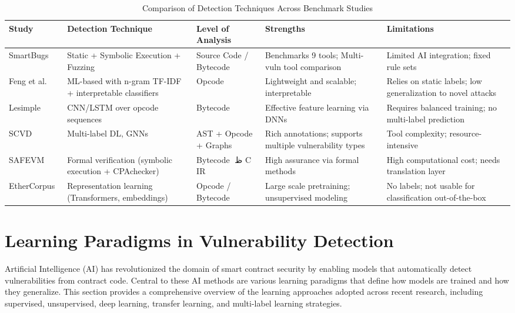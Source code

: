 \begin{table}[H]
\centering
\renewcommand{\arraystretch}{1.3}
\begin{tabular}{|p{3.2cm}|p{2.8cm}|p{2.4cm}|p{3.3cm}|p{2.8cm}|}
\hline
\textbf{Study} & \textbf{Detection Technique} & \textbf{Level of Analysis} & \textbf{Strengths} & \textbf{Limitations} \\ \hline

SmartBugs~\cite{durieux2020empirical} & Static + Symbolic Execution + Fuzzing & Source Code / Bytecode & Benchmarks 9 tools; Multi-vuln tool comparison & Limited AI integration; fixed rule sets \\ \hline

Feng et al.~\cite{feng2024interpretable} & ML-based with n-gram TF-IDF + interpretable classifiers & Opcode & Lightweight and scalable; interpretable & Relies on static labels; low generalization to novel attacks \\ \hline

Lesimple~\cite{lesimple2020master} & CNN/LSTM over opcode sequences & Bytecode & Effective feature learning via DNNs & Requires balanced training; no multi-label prediction \\ \hline

SCVD~\cite{zhang2020scvd} & Multi-label DL, GNNs & AST + Opcode + Graphs & Rich annotations; supports multiple vulnerability types & Tool complexity; resource-intensive \\ \hline

SAFEVM~\cite{albert2019safevm} & Formal verification (symbolic execution + CPAchecker) & Bytecode ظْ C IR & High assurance via formal methods & High computational cost; needs translation layer \\ \hline

EtherCorpus~\cite{tann2020towards} & Representation learning (Transformers, embeddings) & Opcode / Bytecode & Large scale pretraining; unsupervised modeling & No labels; not usable for classification out-of-the-box \\ \hline

\end{tabular}
\caption{Comparison of Detection Techniques Across Benchmark Studies}
\label{tab:detection_comparison}
\end{table}

\section{Learning Paradigms in Vulnerability Detection}
Artificial Intelligence (AI) has revolutionized the domain of smart contract security by enabling models that automatically detect vulnerabilities from contract code. Central to these AI methods are various learning paradigms that define how models are trained and how they generalize. This section provides a comprehensive overview of the learning approaches adopted across recent research, including supervised, unsupervised, deep learning, transfer learning, and multi-label learning strategies.


